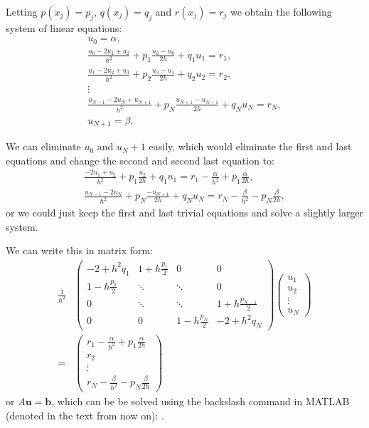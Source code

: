 \documentclass[12pt, a4paper]{article}
\theoremstyle{definition}
\theoremstyle{remark}
\numberwithin{equation}{section}
\begin{document}
Letting $p(x_j)=p_j$, $q(x_j)=q_j$ and $r(x_j)=r_j$ we obtain the following system of linear equations:
\begin{align*}
u_0=\alpha,\\
\frac{u_0-2u_1+u_2}{h^2}+p_1\frac{u_2-u_0}{2h}+q_1 u_1=r_1,\\
\frac{u_1-2u_2+u_3}{h^2}+p_2\frac{u_3-u_1}{2h}+q_2 u_2=r_2,\\
\vdots\\
\frac{u_{N-1}-2u_N+u_{N+1}}{h^2}+p_N\frac{u_{N+1}-u_{N-1}}{2h}+q_N u_N=r_N,\\
u_{N+1}=\beta.
\end{align*}

We can eliminate $u_0$ and $u_N+1$ easily,  which would eliminate the first and last equations and change the second and second last equation to:
\begin{align*}
\frac{-2u_1+u_2}{h^2}+p_1\frac{u_2}{2h}+q_1 u_1=r_1-\frac{\alpha}{h^2}+p_1\frac{\alpha}{2h},\\
\frac{u_{N-1}-2u_N}{h^2}+p_N\frac{-u_{N-1}}{2h}+q_N u_N=r_N - \frac{\beta}{h^2}-p_N\frac{\beta}{2h},
\end{align*}
or we could just keep the first and last trivial equations and solve a slightly larger system.

We can write this in matrix form: 
\begin{align*}
\frac{1}{h^2}
&\begin{pmatrix}
-2+h^2q_1 &1+h\frac{p_1}{2}&0 &0\\
1-h\frac{p_2}{2} &\ddots &\ddots &0\\
0 &\ddots &\ddots &1+h\frac{p_{N-1}}{2}\\
0& 0& 1-h\frac{p_N}{2} &-2 +h^2 q_N
\end{pmatrix}
\begin{pmatrix}
u_1\\
u_2\\
\vdots\\
u_N
\end{pmatrix}
\\
=&
\begin{pmatrix}
r_1-\frac{\alpha}{h^2}+p_1\frac{\alpha}{2h}\\
r_2\\
\vdots\\
r_N-\frac{\beta}{h^2}-p_N\frac{\beta}{2h}
\end{pmatrix}
\end{align*}
or ${A} \mathbf{u} = \mathbf{b} $, which can  be be solved using the backslash command in MATLAB (denoted \mcode{\\ } in the text from now on): .
\end{document}

